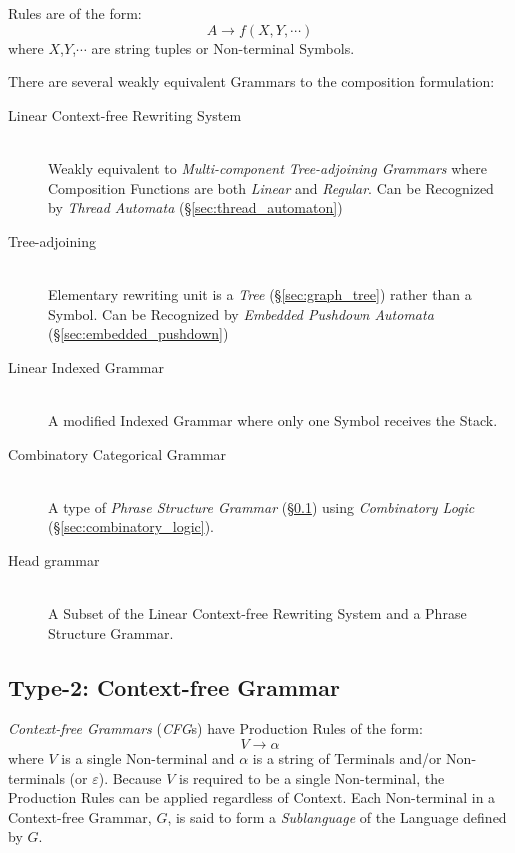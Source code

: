 Rules are of the form:
\[
    A \rightarrow f(X,Y,\cdots)
\]
where $X$,$Y$,$\cdots$ are string tuples or Non-terminal Symbols.

There are several weakly equivalent Grammars to the composition
formulation:

\begin{description}
\item[Linear Context-free Rewriting System] \hfill \\
    Weakly equivalent to \emph{Multi-component Tree-adjoining
      Grammars} where Composition Functions are both \emph{Linear} and
    \emph{Regular}. Can be Recognized by \emph{Thread
      Automata} (\S\ref{sec:thread_automaton})\cite{villemonte02}

\item[Tree-adjoining] \hfill \\
    Elementary rewriting unit is a \emph{Tree}
    (\S\ref{sec:graph_tree}) rather than a Symbol. Can be Recognized
    by \emph{Embedded Pushdown Automata}
    (\S\ref{sec:embedded_pushdown})\cite{vijayashanker88}

\item[Linear Indexed Grammar] \hfill \\
    A modified Indexed Grammar where only one Symbol receives the
    Stack.

\item[Combinatory Categorical Grammar] \hfill \\
    A type of \emph{Phrase Structure Grammar}
    (\S\ref{sec:context_free}) using \emph{Combinatory Logic}
    (\S\ref{sec:combinatory_logic}).

\item[Head grammar] \hfill \\
    A Subset of the Linear Context-free Rewriting System and a Phrase
    Structure Grammar.

\end{description}



\subsection{Type-2: Context-free Grammar}\label{sec:context_free}

\emph{Context-free Grammars} (\emph{CFG}s) have Production Rules of
the form:
\[
    V \rightarrow \alpha
\]
where $V$ is a single Non-terminal and $\alpha$ is a string of Terminals
and/or Non-terminals (or $\varepsilon$). Because $V$ is required to be a
single Non-terminal, the Production Rules can be applied regardless of
Context. Each Non-terminal in a Context-free Grammar, $G$, is said to
form a \emph{Sublanguage} of the Language defined by $G$.


